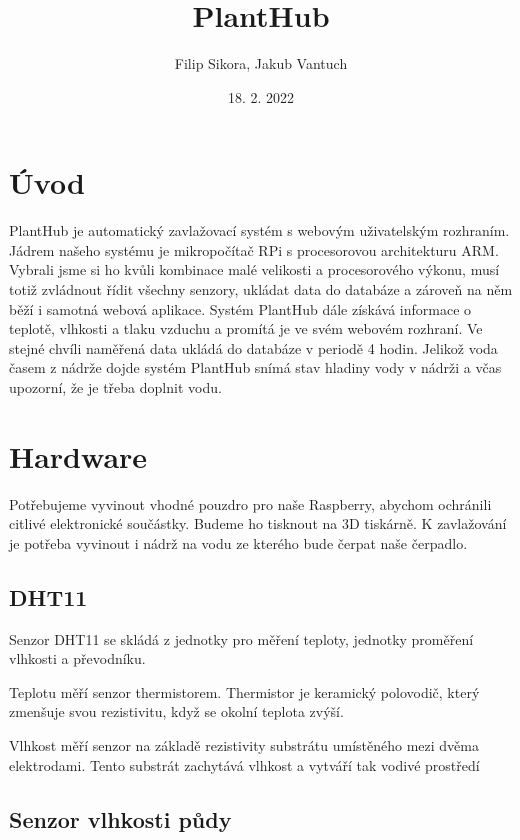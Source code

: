 \documentclass[11pt,a4paper]{article}
\title{PlantHub}
\author{Filip Sikora, Jakub Vantuch}
\date{18. 2. 2022}
\begin{document}
\begin{titlingpage}
	\maketitle
\end{titlingpage}

\section*{Úvod}

PlantHub je automatický zavlažovací systém s webovým uživatelským rozhraním. Jádrem našeho systému je mikropočítač RPi s procesorovou architekturu ARM. Vybrali jsme si ho kvůli kombinace malé velikosti a procesorového výkonu, musí totiž zvládnout řídit všechny senzory, ukládat data do databáze a zároveň na něm běží i samotná webová aplikace. Systém PlantHub dále získává informace o teplotě, vlhkosti a tlaku vzduchu a promítá je ve svém webovém rozhraní. Ve stejné chvíli naměřená data ukládá do databáze v periodě 4 hodin. Jelikož voda časem z nádrže dojde systém PlantHub snímá stav hladiny vody v nádrži a včas upozorní, že je třeba doplnit vodu.

\section*{Hardware}

Potřebujeme vyvinout vhodné pouzdro pro naše Raspberry, abychom ochránili citlivé elektronické součástky. Budeme ho tisknout na 3D tiskárně. K zavlažování je potřeba vyvinout i nádrž na vodu ze kterého bude čerpat naše čerpadlo.

\subsection*{DHT11}

Senzor DHT11 se skládá z jednotky pro měření teploty, jednotky proměření vlhkosti a převodníku.

Teplotu měří senzor thermistorem. Thermistor je keramický polovodič, který zmenšuje svou rezistivitu, když se okolní teplota zvýší.

Vlhkost měří senzor na základě rezistivity substrátu umístěného mezi dvěma elektrodami. Tento substrát zachytává vlhkost a vytváří tak vodivé prostředí

\subsection*{Senzor vlhkosti půdy}
\end{document}
